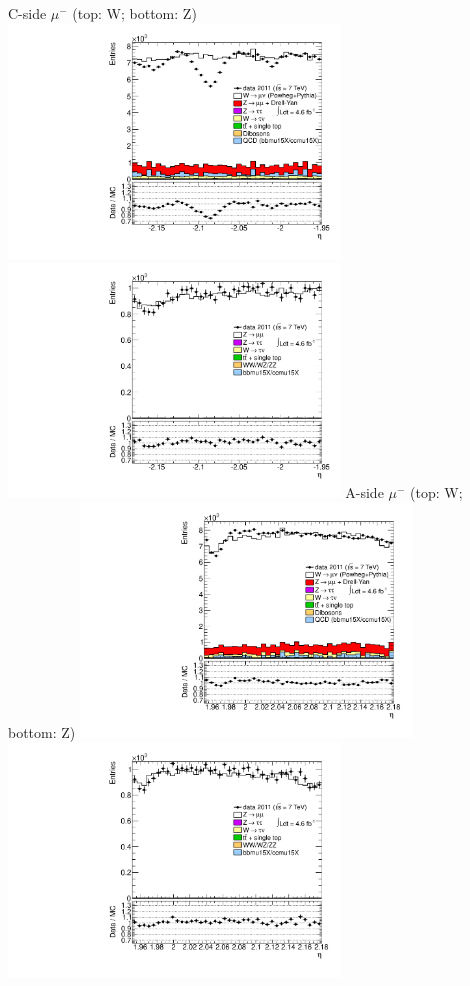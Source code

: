  {
\colb[T]
C-side $\mu^{-}$ (top: W; bottom: Z)
\centering
\includegraphics[width=0.66\textwidth]{dates/20130306/figures/both/W_10_C_stack_l_eta_NEG} \\
\includegraphics[width=0.66\textwidth]{dates/20130306/figures/both/Z_10_C_stack_lN_eta_ALL.pdf}
A-side $\mu^{-}$ (top: W; bottom: Z)
\centering
\includegraphics[width=0.66\textwidth]{dates/20130306/figures/both/W_10_A_stack_l_eta_NEG} \\
\includegraphics[width=0.66\textwidth]{dates/20130306/figures/both/Z_10_A_stack_lN_eta_ALL.pdf} 
\cole
}

